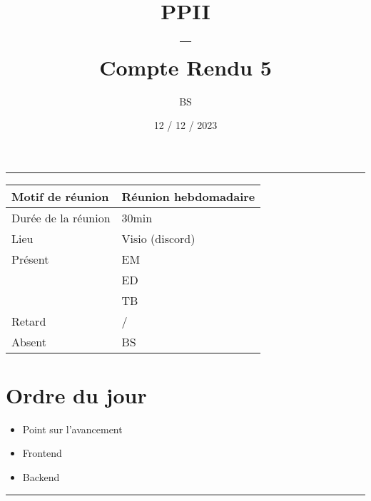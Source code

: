 \documentclass[10pt,a4paper]{report}
\title{PPII \\ -- \\ Compte Rendu 5}
\date{12 / 12 / 2023}
\author{BS}
\begin{document}
\maketitle

\tableofcontents \bigskip

\noindent\rule{\linewidth}{0.5mm} \bigskip

                \begin{tabular}{|l | l|}
                        \hline
                Motif de réunion & Réunion hebdomadaire \\
                        \hline
                Durée de la réunion & 30min \\
                        \hline
                Lieu & Visio (discord) \\
                        \hline
                Présent & EM \\
                        & ED \\
                        & TB  \\
                        \hline
                Retard  & / \\
                        \hline
                Absent  & BS \\
                        \hline
                \end{tabular}


\section{Ordre du jour}
\begin{itemize}
        \item Point sur l’avancement
        \item Frontend
        \item Backend
\end{itemize}

\noindent\rule{\linewidth}{0.5mm} \bigskip
\end{document}
